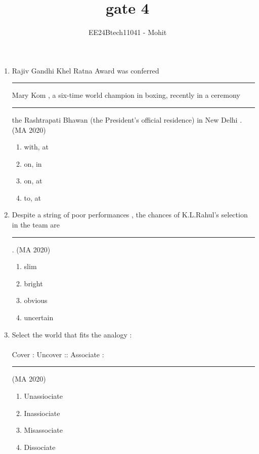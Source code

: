 \documentclass[journal,12pt,onecolumn]{IEEEtran}
\theoremstyle{remark}
\begin{document}
\title{gate 4}
\author{EE24Btech11041 - Mohit}
\maketitle
\renewcommand{\thefigure}{\theenumi}
\renewcommand{\thetable}{\theenumi}


\begin{enumerate}
\item Rajiv Gandhi Khel Ratna Award was conferred \rule{2cm}{0.4pt} Mary Kom , a six-time world champion in boxing, recently in a ceremony \rule{2cm}{0.4pt} the Rashtrapati Bhawan (the President's official residence) in New Delhi .
\hfill{(MA 2020)}

\begin{enumerate}
\item with, at
\item on, in
\item on, at
\item to, at
\end{enumerate}

\item Despite a string of poor performances , the chances of K.L.Rahul's selection in the team are \rule{2cm}{0.4pt} .
\hfill{(MA 2020)}
\begin{enumerate}
\item slim
\item bright
\item obvious
\item uncertain
\end{enumerate}

\item Select the world that fits the analogy :\\
\\
Cover : Uncover :: Associate :  \rule{2cm}{0.4pt}
\hfill{(MA 2020)}
\begin{enumerate}
\item Unassiociate
\item Inassiociate
\item Misassociate
\item Dissociate
\end{enumerate}


\end{enumerate}
\end{document}
